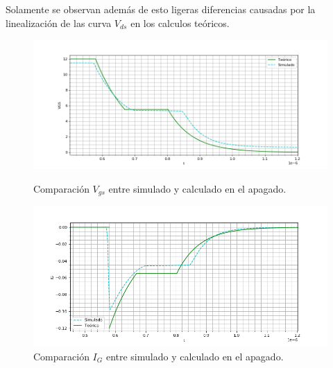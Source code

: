 Solamente se observan además de esto ligeras diferencias causadas por la linealización de las curva $V_{ds}$ en los calculos teóricos.

\begin{figure}
	\centering
	\begin{minipage}{0.5\textwidth}
		\centering
		\includegraphics[width=1.1\textwidth]{ImagenesEjercicio-1/sim_apagado_gate} %
		\caption{Comparación $V_{gs}$ entre simulado y calculado en el apagado.}
		\label{ej1:fig:sim_apagado_gate}
	\end{minipage}\hfill
	\begin{minipage}{0.5\textwidth}
		\centering
		\includegraphics[width=1.1\textwidth]{ImagenesEjercicio-1/sim_apagado_gate_i} %
		\caption{Comparación $I_{G}$ entre simulado y calculado en el apagado.}
		\label{ej1:fig:sim_apagado_gate_i}
	\end{minipage}
\end{figure}
